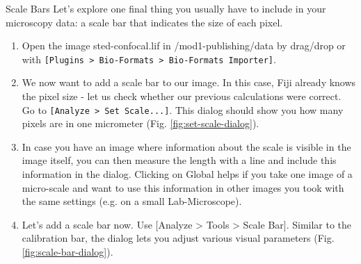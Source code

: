\begin{taskbox}{Scale Bars}
Let's explore one final thing you usually have to include in your microscopy data: a scale bar that indicates the size of each pixel.

\begin{enumerate}
	\item Open the image sted-confocal.lif in /mod1-publishing/data by drag/drop or with \texttt{[Plugins > Bio-Formats > Bio-Formats Importer]}.  
	\item We now want to add a scale bar to our image. In this case, Fiji already knows the pixel size - let us check whether our previous calculations were correct. Go to \texttt{[Analyze > Set Scale...]}. This dialog should show you how many pixels are in one micrometer (Fig. \ref{fig:set-scale-dialog}).
	
	\begin{minipage}[t]{\linewidth}
		\begin{center}
		\medskip
		\label{fig:set-scale-dialog}
		\end{center}
	\end{minipage}
	
	\item In case you have an image where information about the scale is visible in the image itself, you can then measure the length with a line and include this information in the dialog. Clicking on Global helps if you take one image of a micro-scale and want to use this information in other images you took with the same settings (e.g. on a small Lab-Microscope).
	\item Let's add a scale bar now. Use [Analyze > Tools > Scale Bar]. Similar to the calibration bar, the dialog lets you adjust various visual parameters (Fig. \ref{fig:scale-bar-dialog}).
	

\end{enumerate}
\end{taskbox}
